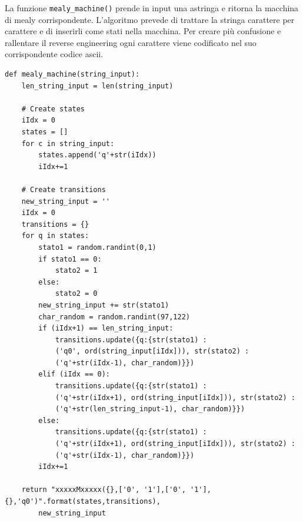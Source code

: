 \documentclass[a4paper,oneside,openright,titlepage,10pt,footinclude,headinclude]{scrbook}
\begin{document}
La funzione \texttt{mealy\_machine()} prende in input una astringa e ritorna la macchina di mealy corrispondente. L'algoritmo prevede di trattare la stringa carattere per carattere e di inserirli come stati nella macchina. Per creare più confusione e rallentare il reverse engineering ogni carattere viene codificato nel suo corrispondente codice ascii.
\begin{graybox}[innerleftmargin=2,]
\begin{lstlisting}
def mealy_machine(string_input):
    len_string_input = len(string_input)

    # Create states
    iIdx = 0
    states = []
    for c in string_input:
        states.append('q'+str(iIdx))
        iIdx+=1

    # Create transitions
    new_string_input = ''
    iIdx = 0
    transitions = {}
    for q in states:
        stato1 = random.randint(0,1)
        if stato1 == 0:
            stato2 = 1
        else:
            stato2 = 0
        new_string_input += str(stato1)
        char_random = random.randint(97,122)
        if (iIdx+1) == len_string_input:
            transitions.update({q:{str(stato1) : 
            ('q0', ord(string_input[iIdx])), str(stato2) : 
            ('q'+str(iIdx-1), char_random)}})
        elif (iIdx == 0):
            transitions.update({q:{str(stato1) : 
            ('q'+str(iIdx+1), ord(string_input[iIdx])), str(stato2) : 
            ('q'+str(len_string_input-1), char_random)}})
        else:
            transitions.update({q:{str(stato1) : 
            ('q'+str(iIdx+1), ord(string_input[iIdx])), str(stato2) : 
            ('q'+str(iIdx-1), char_random)}})
        iIdx+=1

    return "xxxxxMxxxxx({},['0', '1'],['0', '1'],{},'q0')".format(states,transitions), 
        new_string_input
\end{lstlisting}
\end{graybox}
\end{document}

